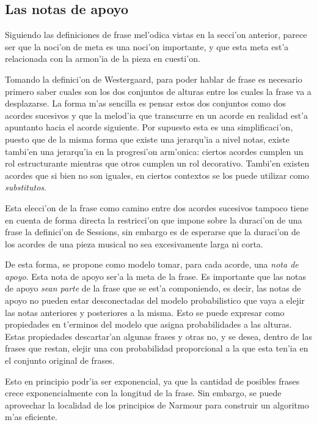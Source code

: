 \subsection{Las notas de apoyo}
Siguiendo las definiciones
de frase mel'odica vistas en la secci'on anterior, parece ser que la noci'on de meta es una noci'on importante, y que esta meta
est'a relacionada con la armon'ia de la pieza en cuesti'on. 

Tomando la definici'on de Westergaard, para poder hablar de frase es necesario primero saber cuales son los dos conjuntos de 
alturas entre los cuales la frase va a desplazarse. La forma m'as sencilla es pensar estos dos conjuntos como dos acordes sucesivos
y que la melod'ia que transcurre en un acorde en realidad est'a apuntanto hacia el acorde siguiente. Por supuesto
esta es una simplificaci'on, puesto que de la misma forma que existe una jerarqu'ia a nivel notas, existe tambi'en una jerarqu'ia
en la progresi'on arm'onica: ciertos acordes cumplen un rol estructurante mientras que otros cumplen un rol decorativo. Tambi'en
existen acordes que si bien no son iguales, en ciertos contextos se los puede utilizar como \emph{substitutos}. 

Esta elecci'on de la frase como camino entre dos acordes sucesivos tampoco tiene en cuenta de forma directa la restricci'on 
que impone sobre la duraci'on de una frase la definici'on de Sessions, sin embargo es de esperarse que la duraci'on de los acordes de una pieza musical
no sea excesivamente larga ni corta. 

De esta forma, se propone como modelo tomar, para cada acorde, una \emph{nota de apoyo}. Esta nota de apoyo ser'a la meta de 
la frase. Es importante que las notas de apoyo \emph{sean parte} de la frase que se est'a componiendo, es decir, las notas
de apoyo no pueden estar desconectadas del modelo probabilistico que vaya a elejir las notas anteriores y posteriores a la misma. 
Esto se puede expresar como propiedades en t'erminos del modelo que asigna probabilidades a las alturas. 
Estas propiedades descartar'an algunas frases y otras no, y se desea, dentro de las frases que restan, elejir una con probabilidad
proporcional a la que esta ten'ia en el conjunto original de frases. 

Esto en principio podr'ia ser exponencial, ya que la cantidad de posibles frases crece exponencialmente con la longitud de la frase.
Sin embargo, se puede aprovechar la localidad de los principios de Narmour para construir un algoritmo m'as eficiente.  


